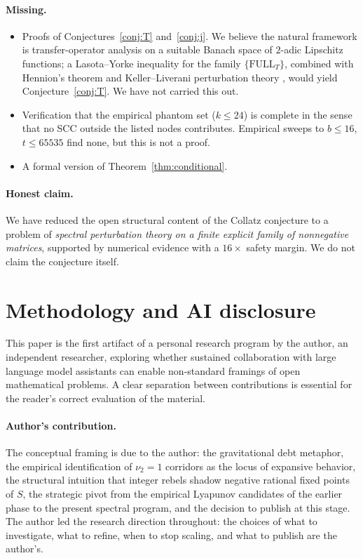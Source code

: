 \documentclass[11pt,a4paper]{article}
\theoremstyle{definition}
\newcommand{\full}{\mathrm{FULL}}
\begin{document}
\paragraph{Missing.}
\begin{itemize}
  \item Proofs of Conjectures~\ref{conj:T} and~\ref{conj:j}. We
        believe the natural framework is transfer-operator analysis
        on a suitable Banach space of $2$-adic Lipschitz functions;
        a Lasota--Yorke inequality for the family
        $\{\full_T\}$, combined with Hennion's theorem and
        Keller--Liverani perturbation theory \cite{kellerliverani},
        would yield Conjecture~\ref{conj:T}. We have not carried
        this out.
  \item Verification that the empirical phantom set ($k \le 24$) is
        complete in the sense that no SCC outside the listed nodes
        contributes. Empirical sweeps to $b \le 16$, $t \le 65535$
        find none, but this is not a proof.
  \item A formal version of Theorem~\ref{thm:conditional}.
\end{itemize}

\paragraph{Honest claim.}
We have reduced the open structural content of the Collatz
conjecture to a problem of \emph{spectral perturbation theory on a
finite explicit family of nonnegative matrices}, supported by
numerical evidence with a $16\times$ safety margin. We do not
claim the conjecture itself.

\section*{Methodology and AI disclosure}

This paper is the first artifact of a personal research program by the
author, an independent researcher, exploring whether sustained
collaboration with large language model assistants can enable
non-standard framings of open mathematical problems. A clear
separation between contributions is essential for the reader's
correct evaluation of the material.

\paragraph{Author's contribution.}
The conceptual framing is due to the author: the gravitational debt
metaphor, the empirical identification of $\nu_2 = 1$ corridors as
the locus of expansive behavior, the structural intuition that integer
rebels shadow negative rational fixed points of $S$, the strategic
pivot from the empirical Lyapunov candidates of the earlier phase to
the present spectral program, and the decision to publish at this
stage. The author led the research direction throughout: the choices
of what to investigate, what to refine, when to stop scaling, and what
to publish are the author's.
\end{document}
